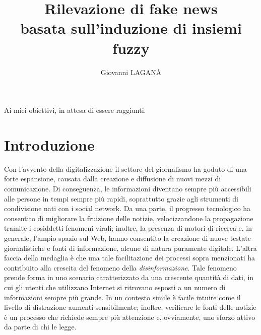\documentclass[12pt]{report}
\theoremstyle{definition}
\begin{document}
\title{Rilevazione di fake news \\
basata sull'induzione di insiemi fuzzy}
\author{Giovanni LAGANÀ}
%
%
%
\beforepreface
        {\hfill \Large {\sl \begin{flushright} Ai miei obiettivi, in attesa di essere raggiunti.         
\end{flushright}         }}
%
%
%
%
\afterpreface

%
%

\chapter*{Introduzione}
  
\onehalfspacing
Con l'avvento della digitalizzazione il settore del giornalismo ha goduto di una forte espansione, causata dalla creazione e diffusione di nuovi mezzi di comunicazione. Di conseguenza, le informazioni diventano sempre più accessibili alle persone in tempi sempre più rapidi, soprattutto grazie agli strumenti di condivisione nati con i social network.
Da una parte, il progresso tecnologico ha consentito di migliorare la fruizione delle notizie, velocizzandone la propagazione tramite i cosiddetti fenomeni virali; inoltre, la presenza di motori di ricerca e, in generale, l'ampio spazio sul Web, hanno consentito la creazione di nuove testate giornalistiche e fonti di informazione, alcune di natura puramente digitale.
L'altra faccia della medaglia è che una tale facilitazione dei processi sopra menzionati ha contribuito alla crescita del fenomeno della \textit{disinformazione}.
Tale fenomeno prende forma in uno scenario caratterizzato da una crescente quantità di dati, in cui gli utenti che utilizzano Internet si ritrovano esposti a un numero di informazioni sempre più grande.
In un contesto simile è facile intuire come il livello di distrazione aumenti sensibilmente; inoltre, verificare le fonti delle notizie è un processo che richiede sempre più attenzione e, ovviamente, uno sforzo attivo da parte di chi le legge.
\end{document}
